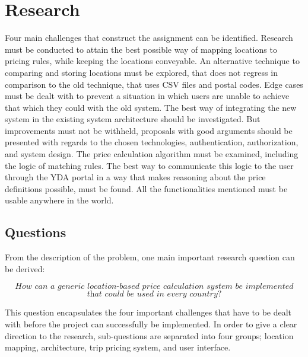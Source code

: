 %
\section{Research}
Four main challenges that construct the assignment can be identified. Research must be conducted to attain the best possible way of mapping locations to pricing rules, while keeping the locations conveyable. An alternative technique to comparing and storing locations must be explored, that does not regress in comparison to the old technique, that uses CSV files and postal codes. Edge cases must be dealt with to prevent a situation in which users are unable to achieve that which they could with the old system. The best way of integrating the new system in the existing system architecture should be investigated. But improvements must not be withheld, proposals with good arguments should be presented with regards to the chosen technologies, authentication, authorization, and system design. The price calculation algorithm must be examined, including the logic of matching rules. The best way to communicate this logic to the user through the YDA portal in a way that makes reasoning about the price definitions possible, must be found. All the functionalities mentioned must be usable anywhere in the world.
\subsection{Questions}

From the description of the problem, one main important research question can be derived:

\[\textit{How can a generic location-based price calculation system be implemented}\]
\[\textit{that could be used in every country?}\] \hfill

This question encapsulates the four important challenges that have to be dealt with before the project can successfully be implemented. In order to give a clear direction to the research, sub-questions are separated into four groups; location mapping, architecture, trip pricing system, and user interface.

